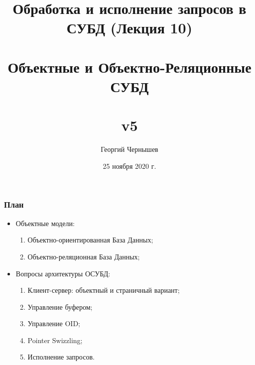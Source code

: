 \documentclass{beamer}
\title[Обработка и исполнение запросов: лекция 10]{Обработка и исполнение запросов в СУБД (Лекция 10) \\~\\ Объектные и Объектно-Реляционные СУБД\\~\\ v5} %
\author{Георгий Чернышев} %
\institute[ВШЭ] %
{
Высшая Школа Экономики \\ %
\medskip
\textit{chernishev@gmail.com} %
}
\date{25 ноября 2020 г.}
\begin{document}
\begin{frame}
\titlepage %
\end{frame}

\begin{frame}
\frametitle{План}

\begin{itemize}
  \item Объектные модели: 
  \begin{enumerate}
    \item Объектно-ориентированная База Данных;
    \item Объектно-реляционная База Данных;
  \end{enumerate}
  \item Вопросы архитектуры ОСУБД:
  \begin{enumerate}
    \item Клиент-сервер: объектный и страничный вариант;
    \item Управление буфером;
    \item Управление OID;
    \item Pointer Swizzling;
    \item Исполнение запросов.
  \end{enumerate}
\end{itemize}
\end{frame}
\end{document}
